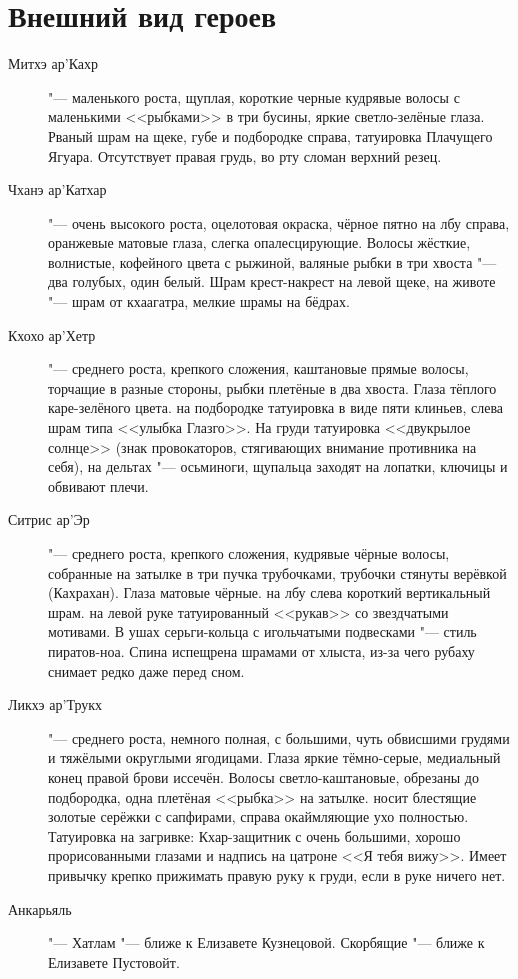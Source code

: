 \documentclass[a4paper,10pt]{book}
\begin{document}
\section{Внешний вид героев}

\begin{description}
\item[Митхэ ар'Кахр] "--- маленького роста, щуплая, короткие черные кудрявые 
волосы с маленькими 
<<рыбками>> в три бусины, яркие светло-зелёные глаза. Рваный шрам на щеке, губе 
и подбородке справа, татуировка Плачущего Ягуара. Отсутствует правая грудь, во 
рту сломан верхний резец.
\item[Чханэ ар'Катхар] "--- очень высокого роста, оцелотовая окраска, чёрное 
пятно на лбу справа, оранжевые 
матовые глаза, слегка опалесцирующие. Волосы жёсткие, волнистые, кофейного 
цвета 
с рыжиной, валяные рыбки в три хвоста "--- два голубых, один белый. Шрам 
крест-накрест на левой щеке, на животе "--- шрам от кхаагатра, мелкие шрамы на 
бёдрах.
\item[Кхохо ар'Хетр] "--- среднего роста, крепкого сложения, каштановые прямые 
волосы, торчащие в разные 
стороны, рыбки плетёные в два хвоста. Глаза тёплого каре-зелёного цвета. на 
подбородке татуировка в виде пяти клиньев, слева шрам типа <<улыбка Глазго>>. 
На 
груди татуировка <<двукрылое солнце>> (знак провокаторов, стягивающих внимание 
противника на себя), на дельтах "--- осьминоги, щупальца 
заходят на лопатки, ключицы и обвивают плечи.
\item[Ситрис ар'Эр] "--- среднего роста, крепкого сложения, кудрявые чёрные 
волосы, собранные на затылке 
в три пучка трубочками, трубочки стянуты верёвкой (Кахрахан). Глаза матовые 
чёрные. на лбу слева  короткий вертикальный шрам. на левой руке татуированный 
<<рукав>> со звездчатыми мотивами. В ушах серьги-кольца с игольчатыми 
подвесками 
"--- стиль пиратов-ноа. Спина испещрена шрамами от хлыста, из-за чего рубаху 
снимает редко даже перед сном.
\item[Ликхэ ар'Трукх] "--- среднего роста, немного полная, с большими, чуть 
обвисшими грудями и тяжёлыми 
округлыми ягодицами. Глаза яркие тёмно-серые, медиальный конец правой брови 
иссечён. Волосы светло-каштановые, обрезаны до подбородка, одна плетёная 
<<рыбка>> на затылке. носит блестящие золотые серёжки с сапфирами, справа 
окаймляющие ухо полностью. Татуировка на загривке: Кхар-защитник с очень 
большими, хорошо прорисованными глазами и надпись на цатроне <<Я тебя вижу>>. 
Имеет привычку крепко прижимать правую руку к груди, если в руке ничего нет.
\item[Анкарьяль] "--- Хатлам "--- ближе к Елизавете Кузнецовой. Скорбящие "--- 
ближе к Елизавете Пустовойт.
\end{description}
\end{document}
